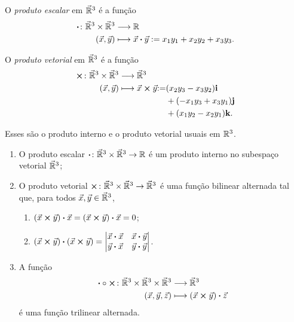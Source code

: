 \begin{definition}
O \emph{produto escalar} em $\vec{\mathbb{R}}^3$ é a função
	\begin{align*}
	{\bm{\cdot}}\colon {\vec{\mathbb{R}}^3 \times \vec{\mathbb{R}}^3} &\longrightarrow {\mathbb{R}} \\{(\vec{x},\vec{y})} &\longmapsto {\vec{x}} \bm{\cdot} {\vec{y}} := x_1y_1 + x_2y_2 + x_3y_3.
	\end{align*}

O \emph{produto vetorial} em $\vec{\mathbb{R}}^3$ é a função
	\begin{align*}
	\func{\bm{\times}}{\vec{\R}^3 \times \vec{\R}^3}{\vec{\R}^3}{(\vec{x},\vec{y})}{\pvec{\vec{x}}{\vec{y}}
		\begin{aligned}[t]
			:=& (x_2y_3-x_3y_2)\bm\ii \\
			&+ (-x_1y_3+x_3y_1)\bm\jj \\
			&+ (x_1y_2-x_2y_1)\bm\kk.
		\end{aligned}
	}
	\end{align*}
\end{definition}

Esses são o produto interno e o produto vetorial usuais em $\mathbb{R}^3$.

\begin{exercise}
	\begin{enumerate}
	\item O produto escalar $\bm{\cdot}\colon \vec{\mathbb{R}}^3 \times \vec{\mathbb{R}}^3 \to \mathbb{R}$ é um produto interno no subespaço vetorial $\vec{\mathbb{R}}^3$;
	
	\item O produto vetorial $\bm{\times}\colon \vec{\mathbb{R}}^3 \times \vec{\mathbb{R}}^3 \to \vec{\mathbb{R}}^3$ é uma função bilinear alternada tal que, para todos $\vec{x},\vec{y} \in \vec{\mathbb{R}}^3$,
		\begin{enumerate}
		\item $
			{({\vec{x}} \bm{\times} {\vec{y}})} \bm{\cdot} {\vec{x}} = {({\vec{x}} \bm{\times} {\vec{y}})} \bm{\cdot} {\vec{x}} = 0$;
		
		\item ${({\vec{x}} \bm{\times} {\vec{y}})} \bm{\cdot} {({\vec{x}} \bm{\times} {\vec{y}})} =
				\begin{vmatrix}
				{\vec{x}} \bm{\cdot} {\vec{x}} & {\vec{x}} \bm{\cdot} {\vec{y}} \\ 
				{\vec{y}} \bm{\cdot} {\vec{x}} & {\vec{y}} \bm{\cdot} {\vec{y}}
				\end{vmatrix}$.
		\end{enumerate}
	
	\item A função
		\begin{align*}
		{\bm{\cdot} \circ \bm{\times}}\colon {\vec{\mathbb{R}}^3 \times \vec{\mathbb{R}}^3 \times \vec{\mathbb{R}}^3} &\longrightarrow {\vec{\mathbb{R}}^3} \\{(\vec{x},\vec{y},\vec{z})} &\longmapsto {({\vec{x}} \bm{\times} {\vec{y}})} \bm{\cdot} {\vec{z}}
		\end{align*}
é uma função trilinear alternada.
	\end{enumerate}
\end{exercise}



